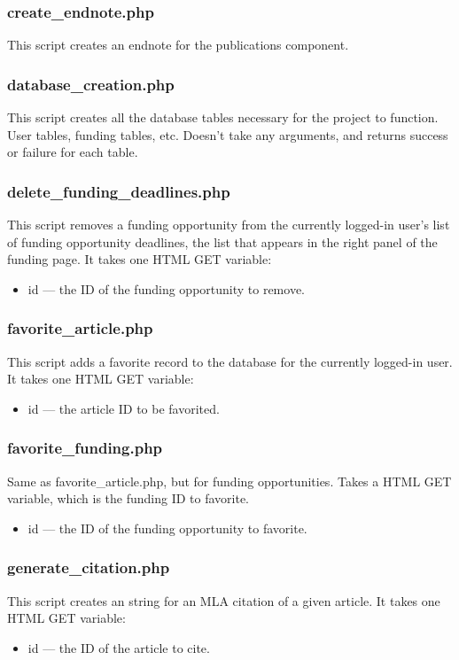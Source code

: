 \documentclass[onecolumn]{IEEEtran}
\begin{document}
\subsubsection{create\_endnote.php}
This script creates an endnote for the publications component. 

\subsubsection{database\_creation.php}
This script creates all the database tables necessary for the project to function. User tables, funding tables, etc. Doesn't take any arguments, and returns success or failure for each table. 

\subsubsection{delete\_funding\_deadlines.php}
This script removes a funding opportunity from the currently logged-in user's list of funding opportunity deadlines, the list that appears in the right panel of the funding page. It takes one HTML GET variable: 
\begin{itemize}
    \item  id --- the ID of the funding opportunity to remove. 
\end{itemize}   

\subsubsection{favorite\_article.php}
This script adds a favorite record to the database for the currently logged-in user. It takes one HTML GET variable: 
\begin{itemize}
    \item id --- the article ID to be favorited. 
\end{itemize}    

\subsubsection{favorite\_funding.php}
Same as favorite\_article.php, but for funding opportunities. Takes a HTML GET variable, which is the funding ID to favorite. 
\begin{itemize}
    \item id --- the ID of the funding opportunity to favorite. 
\end{itemize}    

\subsubsection{generate\_citation.php}
This script creates an string for an MLA citation of a given article. It takes one HTML GET variable: 
\begin{itemize}
    \item id --- the ID of the article to cite. 
\end{itemize}    
\end{document}
